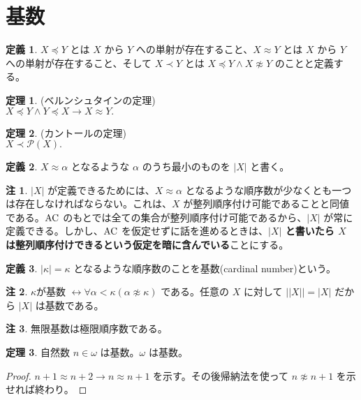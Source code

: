 \documentclass{jsarticle}
\theoremstyle{definition}
\newtheorem*{definition*}{定義}
\newtheorem{theorem}{定理}[section]
\newtheorem{remark}{注}[section]
\begin{document}
    \section{基数}
    \begin{definition*}
        $X \preceq Y$ とは $X$ から $Y$ への単射が存在すること、$X \approx Y$ とは $X$ から $Y$ への単射が存在すること、そして $X \prec Y$ とは $X \preceq Y \land X \not\approx Y$ のことと定義する。
    \end{definition*}
    \begin{theorem} \label{Bernstein} (ベルンシュタインの定理) \\
        $X \preceq Y \land Y \preceq X \rightarrow X \approx Y.$ 
    \end{theorem}
    \begin{theorem} \label{Cantor} (カントールの定理) \\
        $X \prec \mathcal{P}(X).$ 
    \end{theorem}
    \vspace{1ex}
    
    \begin{definition*}
        $X \approx \alpha$ となるような $\alpha$ のうち最小のものを $|X|$ と書く。
    \end{definition*}
    \begin{remark}
        $|X|$ が定義できるためには、$X \approx \alpha$ となるような順序数が少なくとも一つは存在しなければならない。これは、$X$ が整列順序付け可能であることと同値である。$\rm AC$ のもとでは全ての集合が整列順序付け可能であるから、$|X|$ が常に定義できる。しかし、$\rm AC$ を仮定せずに話を進めるときは、{\bf $|X|$ と書いたら $X$ は整列順序付けできるという仮定を暗に含んでいる}ことにする。
    \end{remark}
    \begin{definition*}
        $|\kappa| = \kappa$ となるような順序数のことを基数(cardinal number)という。
    \end{definition*}
    \begin{remark}
        $\kappa$が基数 $\leftrightarrow \forall \alpha < \kappa(\alpha \not\approx \kappa)$ である。任意の $X$ に対して $||X|| = |X|$ だから $|X|$ は基数である。
    \end{remark}
    \begin{remark}
        無限基数は極限順序数である。
    \end{remark}
    \vspace{1ex}
    
    \begin{theorem}
        自然数 $n \in \omega$ は基数。$\omega$ は基数。
    \end{theorem}
    \begin{proof}
        $n+1 \approx n+2 \rightarrow n \approx n+1$ を示す。その後帰納法を使って $n \not\approx n+1$ を示せれば終わり。
    \end{proof}
    
\end{document}
